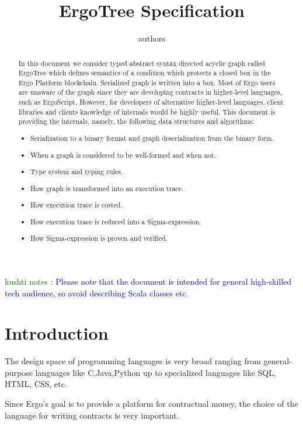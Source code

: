 \documentclass[11pt]{article}
\newcommand{\authnote}[2]{\textsf{#1 \textcolor{blue}{: #2}}}
\newcommand{\knote}[1]{{\authnote{\textcolor{green}{kushti notes}}{#1}}}
\newcommand{\ASDag}{ErgoTree\xspace}
\begin{document}
\title{ErgoTree Specification}

\author{authors}


\maketitle

\begin{abstract}
In this document we consider typed abstract syntax directed acyclic graph
called \ASDag which defines semantics of a condition which protects a closed
box in the Ergo Platform blockchain. Serialized graph is written into a box.
Most of Ergo users are unaware of the graph since they are developing contracts in higher-level languages, such as
ErgoScript. However, for developers of alternative higher-level languages, client libraries and clients knowledge of
internals would be highly useful. This document is providing the internals, namely, the following data structures and
algorithms:
\begin{itemize}
\item{} Serialization to a binary format and graph deserialization from the binary form.
\item{} When a graph is considered to be well-formed and when not.
\item{} Type system and typing rules.
\item{} How graph is transformed into an execution trace.
\item{} How execution trace is costed.
\item{} How execution trace is reduced into a Sigma-expression.
\item{} How Sigma-expression is proven and verified.
\end{itemize}
\end{abstract}

\knote{Please note that the document is intended for general high-skilled tech audience, so avoid describing Scala
classes etc.}

\tableofcontents

\section{Introduction}
\label{sec:intro}

The design space of programming languages is very broad ranging from
general-purpose languages like C,Java,Python up to specialized languages 
like SQL, HTML, CSS, etc.

Since Ergo's goal is to provide a platform for contractual money, the choice
of the language for writing contracts is very important. 
\end{document}
